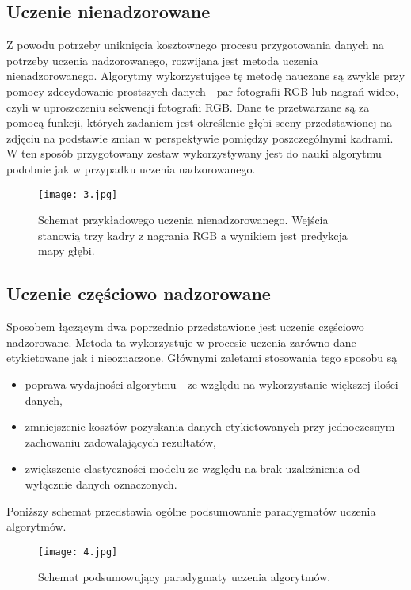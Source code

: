 \subsection{Uczenie nienadzorowane}
Z powodu potrzeby uniknięcia kosztownego procesu przygotowania danych na potrzeby uczenia nadzorowanego, rozwijana jest metoda uczenia nienadzorowanego. Algorytmy wykorzystujące tę metodę nauczane są zwykle przy pomocy zdecydowanie prostszych danych - par fotografii RGB lub nagrań wideo, czyli w uproszczeniu sekwencji fotografii RGB. Dane te przetwarzane są za pomocą funkcji, których zadaniem jest określenie głębi sceny przedstawionej na zdjęciu na podstawie zmian w perspektywie pomiędzy poszczególnymi kadrami. W ten sposób przygotowany zestaw wykorzystywany jest do nauki algorytmu podobnie jak w przypadku uczenia nadzorowanego.
\begin{figure}[H]
    \centering
    \texttt{[image: 3.jpg]}
    \caption{Schemat przykładowego uczenia nienadzorowanego. Wejścia stanowią trzy kadry z nagrania RGB a wynikiem jest predykcja mapy głębi.}
    \label{fig:uczenie-nienadzorowane}
\end{figure}

\subsection{Uczenie częściowo nadzorowane}
Sposobem łączącym dwa poprzednio przedstawione jest uczenie częściowo nadzorowane. Metoda ta wykorzystuje w procesie uczenia zarówno dane etykietowane jak i nieoznaczone. Głównymi zaletami stosowania tego sposobu są
\begin{itemize}
\item poprawa wydajności algorytmu - ze względu na wykorzystanie większej ilości danych,
\item zmniejszenie kosztów pozyskania danych etykietowanych przy jednoczesnym zachowaniu zadowalających rezultatów,
\item zwiększenie elastyczności modelu ze względu na brak uzależnienia od wyłącznie danych oznaczonych.
\end{itemize}

\vspace{1cm}
Poniższy schemat przedstawia ogólne podsumowanie paradygmatów uczenia algorytmów.
\begin{figure}[H]
    \centering
    \texttt{[image: 4.jpg]}
    \caption{Schemat podsumowujący paradygmaty uczenia algorytmów.}
    \label{fig:podsumowanie-uczenia}
\end{figure}

